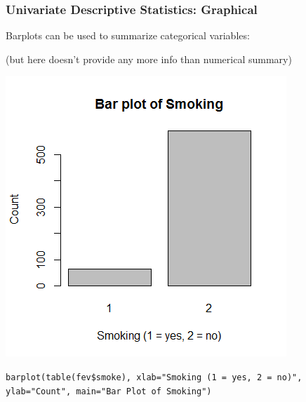 \documentclass[12pt, 
hyperref={colorlinks=true, linkcolor=blue, urlcolor=cyan}]{beamer}
\begin{document}
\begin{frame}
\frametitle{Univariate Descriptive Statistics: Graphical}

Barplots can be used to summarize categorical variables: \\ \begin{footnotesize} (but here doesn't provide any more info than numerical summary) \end{footnotesize}\vspace{-0.8cm} %

\center \includegraphics[height=0.6\textheight]{./barplot-smoke}

\vspace{-0.5cm} \begin{scriptsize} \texttt{barplot(table(fev\$smoke), xlab="Smoking (1 = yes, 2 = no)", ylab="Count", main="Bar Plot of Smoking")\\} \end{scriptsize}
\end{frame}
\end{document}
